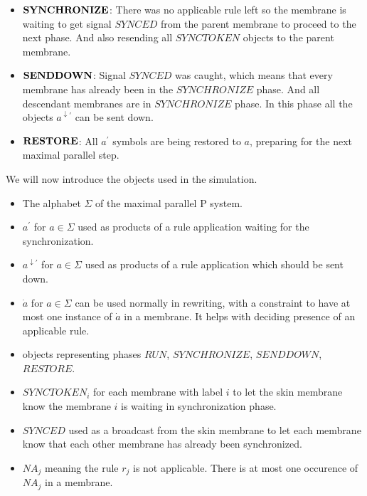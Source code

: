 \begin{dokaz}
\begin{itemize}
    \item $\mathit{\bf SYNCHRONIZE}$: There was no applicable rule left so the membrane is waiting to get signal $\mathit{SYNCED}$ from the parent membrane to proceed to the next phase. And also resending all $\mathit{SYNCTOKEN}$ objects to the parent membrane.

    \item $\mathit{\bf SENDDOWN}$: Signal $\mathit{SYNCED}$ was caught, which means that every membrane has already been in the $\mathit{SYNCHRONIZE}$ phase. And all descendant membranes are in $\mathit{SYNCHRONIZE}$ phase. In this phase all the objects $a^{\downarrow\prime}$ can be sent down.

    \item $\mathit{\bf RESTORE}$: All $a^{\prime}$ symbols are being restored to $a$, preparing for the next maximal parallel step.
  \end{itemize}


  We will now introduce the objects used in the simulation.
  
  \begin{itemize}
    \item The alphabet $\Sigma$ of the maximal parallel P system.
    \item $a^\prime$ for $a\in\Sigma$ used as products of a rule application waiting for the synchronization.
    \item $a^{\downarrow\prime}$ for $a\in\Sigma$ used as products of a rule application which should be sent down. 
    \item $\dot{a}$ for $a\in\Sigma$ can be used normally in rewriting, with a constraint to have at most one instance of $\dot{a}$ in a membrane. It helps with deciding presence of an applicable rule. 
    \item objects representing phases $\mathit{RUN}$, $\mathit{SYNCHRONIZE}$, $\mathit{SENDDOWN}$, $\mathit{RESTORE}$.
    \item $SYNCTOKEN_i$ for each membrane with label $i$ to let the skin membrane know the membrane $i$ is waiting in synchronization phase.
    \item $SYNCED$ used as a broadcast from the skin membrane to let each membrane know that each other membrane has already been synchronized.
    \item $NA_j$ meaning the rule $r_j$ is not applicable. There is at most one occurence of $NA_j$ in a membrane.
  \end{itemize}


\end{dokaz}
